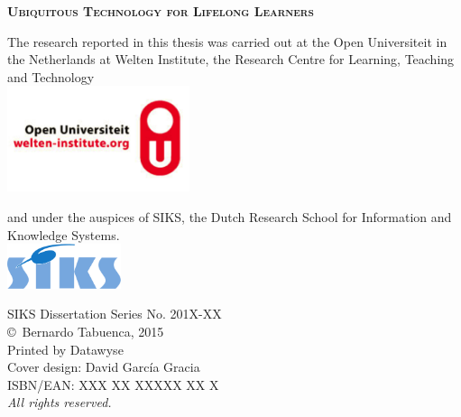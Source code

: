 \documentclass[normalheadings,tablecaptionabove,twoside,openright,chapterprefix,halfparskip,fontsize=10pt,numbers=noenddot]{scrbook} %
\begin{document}
\nocite{*} %

\begin{titlepage}
	\null\vspace*{15.25em}
	\center
	\huge
	\textbf{\textsc{Ubiquitous Technology for Lifelong Learners}}\\
	\vfill\null
	
	\newpage
	\pagestyle{empty}
	\raggedright
	\normalsize
	The research reported in this thesis was carried out at the Open Universiteit in the Netherlands at Welten Institute, the Research Centre for Learning, Teaching and Technology\\
	\vspace*{1em}
	\center
	\includegraphics[width=0.4\textwidth]{figures/welten} \\ %
	\vspace*{1em}
	\raggedright
	and under the auspices of SIKS, the Dutch Research School for Information and Knowledge Systems.\\
	\vspace*{1em}
	\center
	\includegraphics[width=0.25\textwidth]{figures/siks-kleur}\\ %
	\vfill
	\raggedright
	SIKS Dissertation Series No. 201X-XX \\
	\vspace*{2em}
	\copyright~Bernardo Tabuenca, 2015\\
	Printed by Datawyse\\
	Cover design: David Garc\'ia Gracia\\
	\vspace*{2em}
	ISBN/EAN: XXX XX XXXXX XX X\\
	\textit{All rights reserved.}
	

\end{titlepage}
\end{document}
